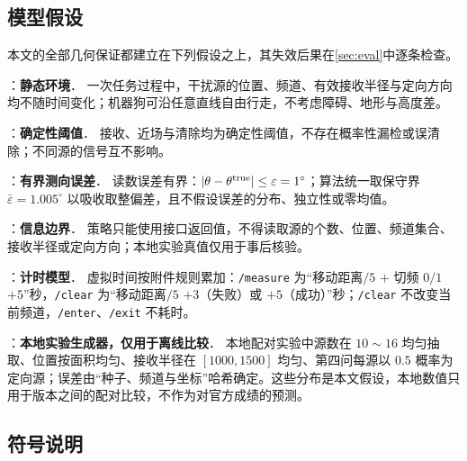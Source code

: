 \subsection{模型假设}

本文的全部几何保证都建立在下列假设之上，其失效后果在\cref{sec:eval}中逐条检查。

\begin{assumption}：\textbf{静态环境}．\label{asu:static}
一次任务过程中，干扰源的位置、频道、有效接收半径与定向方向均不随时间变化；机器狗可沿任意直线自由行走，不考虑障碍、地形与高度差。
\end{assumption}

\begin{assumption}：\textbf{确定性阈值}．\label{asu:threshold}
接收、近场与清除均为确定性阈值，不存在概率性漏检或误清除；不同源的信号互不影响。
\end{assumption}

\begin{assumption}：\textbf{有界测向误差}．\label{asu:bounded}
读数误差有界：$|\theta-\theta^{\rm true}|\le\varepsilon=1^\circ$；算法统一取保守界 $\bar\varepsilon=1.005^\circ$ 以吸收取整偏差，且不假设误差的分布、独立性或零均值。
\end{assumption}

\begin{assumption}：\textbf{信息边界}．\label{asu:info}
策略只能使用接口返回值，不得读取源的个数、位置、频道集合、接收半径或定向方向；本地实验真值仅用于事后核验。
\end{assumption}

\begin{assumption}：\textbf{计时模型}．\label{asu:time}
虚拟时间按附件规则累加：\texttt{/measure} 为“移动距离$/5$ $+$ 切频 $0/1$ $+5$”秒，\texttt{/clear} 为“移动距离$/5$ $+3$（失败）或 $+5$（成功）”秒；\texttt{/clear} 不改变当前频道，\texttt{/enter}、\texttt{/exit} 不耗时。
\end{assumption}

\begin{assumption}：\textbf{本地实验生成器，仅用于离线比较}．\label{asu:gen}
本地配对实验中源数在 $10\sim16$ 均匀抽取、位置按面积均匀、接收半径在 $[1000,1500]$ 均匀、第四问每源以 $0.5$ 概率为定向源；误差由“种子、频道与坐标”哈希确定。这些分布是本文假设，本地数值只用于版本之间的配对比较，不作为对官方成绩的预测。
\end{assumption}

\subsection{符号说明}


